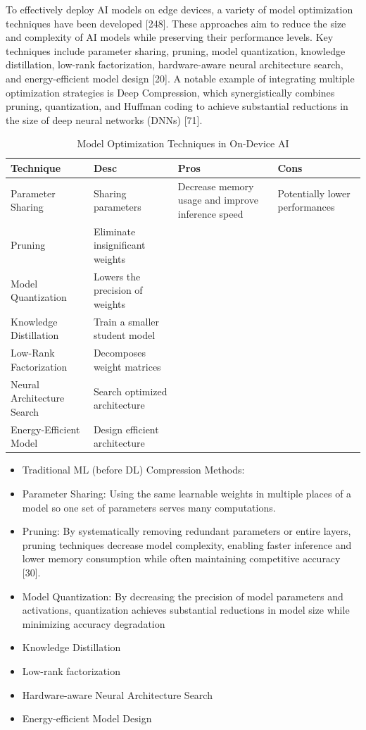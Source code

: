 To effectively deploy AI models on edge devices, a variety of model optimization techniques have been developed [248]. These approaches aim to reduce the size and complexity of AI models while preserving their performance levels. Key techniques include parameter sharing, pruning, model quantization, knowledge distillation, low-rank factorization, hardware-aware neural architecture search, and energy-efficient model design [20]. A notable example of integrating multiple optimization strategies is Deep Compression, which synergistically combines pruning, quantization, and Huffman coding to achieve substantial reductions in the size of deep neural networks (DNNs) [71]. 

\begin{table}[h]
	\setlength{\tabcolsep}{5pt}
	\caption{Model Optimization Techniques in On-Device AI}
	\centering
	\begin{tabular}{llll}
		\toprule
		Technique & Desc & Pros & Cons \\
		 \midrule
		 Parameter Sharing & Sharing parameters & Decrease memory usage and improve inference speed & Potentially lower performances\\
		 Pruning & Eliminate insignificant weights &  & \\
		 Model Quantization & Lowers the precision of weights &  & \\
		 Knowledge Distillation & Train a smaller student model &  & \\
		 Low-Rank Factorization & Decomposes weight matrices  &  & \\
		 Neural Architecture Search& Search optimized architecture &  & \\
		 Energy-Efficient Model& Design efficient architecture &  & \\
		 \bottomrule 
	\end{tabular}
\end{table}


\begin{itemize}
	\item Traditional ML (before DL) Compression Methods:
	\item Parameter Sharing: Using the same learnable weights in multiple places of a model so one set of parameters serves many computations.
	\item Pruning:  By systematically removing redundant parameters or entire layers, pruning techniques decrease model complexity, enabling faster inference and lower memory consumption while often maintaining competitive accuracy [30].
	\item Model Quantization: By decreasing the precision of model parameters and activations, quantization achieves substantial reductions in model size while minimizing accuracy degradation
	\item Knowledge Distillation
	\item Low-rank factorization
	\item Hardware-aware Neural Architecture Search
	\item Energy-efficient Model Design
\end{itemize}

